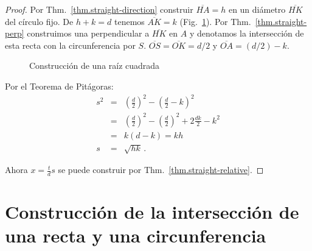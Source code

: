 {\begin{proof}
Por Thm.~\ref{thm.straight-direction} construir $\overline{HA}= h$ en un diámetro $\overline{HK}$ del círculo fijo. De $h+k=d$ tenemos $\overline{AK}=k$ (Fig.~\ref{f.se-sqrt}). Por Thm.~\ref{thm.straight-perp} construimos una perpendicular a $\overline{HK}$ en $A$ y denotamos la intersección de esta recta con la circunferencia por $S$. $\overline{OS}=\overline{OK}=d/2$ y $\overline{OA}=(d/2)-k$. 
\begin{figure}[t]
\begin{center}
\end{center}
\caption{Construcción de una raíz cuadrada}\label{f.se-sqrt}
\end{figure}

Por el Teorema de Pitágoras:
\begin{eqnarray*}
s^2&=& \left(\frac{d}{2}\right)^2 - \left(\frac{d}{2}-k\right)^2\\
&=& \left(\frac{d}{2}\right)^2 - \left(\frac{d}{2}\right)^2 + 2\frac{dk}{2} - k^2\\
&=& k(d-k) = kh\\
s&=&\sqrt{hk}\,.
\end{eqnarray*}

Ahora $x=\displaystyle\frac{t}{d}s$ se puede construir por Thm.~\ref{thm.straight-relative}.
\end{proof}

\section{Construcción de la intersección de una recta y una circunferencia}\label{s.line-circle-straight}

}
